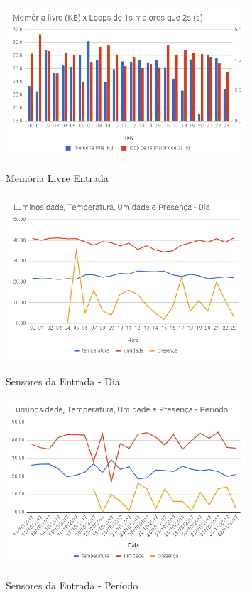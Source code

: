 \begin{figure}[H]
	\centering
	\caption{Memória Livre Entrada}
	\includegraphics[width=0.8\textwidth]{memLivreEntrada}
	\label{fig:memLivreEntrada}
\end{figure}

\begin{figure}[H]
	\centering
	\caption{Sensores da Entrada - Dia}
	\includegraphics[width=0.8\textwidth]{sensoresEntradaDia}
	\label{fig:sensoresEntradaDia}
\end{figure}

\begin{figure}[H]
	\centering
	\caption{Sensores da Entrada - Período}
	\includegraphics[width=0.8\textwidth]{sensoresEntradaPeriodo}
	\label{fig:sensoresEntradaPeriodo}
\end{figure}

